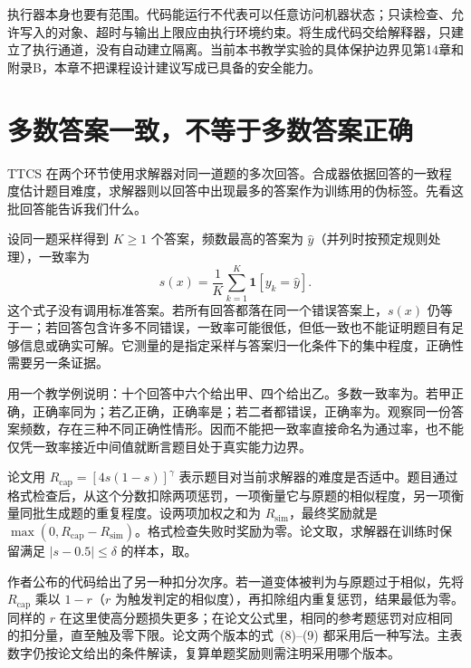 执行器本身也要有范围。代码能运行不代表可以任意访问机器状态；只读检查、允许写入的对象、超时与输出上限应由执行环境约束。将生成代码交给解释器，只建立了执行通道，没有自动建立隔离。当前本书教学实验的具体保护边界见第14章和附录B，本章不把课程设计建议写成已具备的安全能力。

\section{多数答案一致，不等于多数答案正确}
\label{sec:ch11-consensus}

TTCS 在两个环节使用求解器对同一道题的多次回答。合成器依据回答的一致程度估计题目难度，求解器则以回答中出现最多的答案作为训练用的伪标签\cite{ttcs-2601}。先看这批回答能告诉我们什么。

设同一题采样得到 $K\geq1$ 个答案，频数最高的答案为 $\hat y$（并列时按预定规则处理），一致率为
\begin{equation}
 s(x)=\frac{1}{K}\sum_{k=1}^{K}\mathbf1[y_k=\hat y].
 \label{eq:ch11-consistency}
\end{equation}
这个式子没有调用标准答案。若所有回答都落在同一个错误答案上，$s(x)$ 仍等于一；若回答包含许多不同错误，一致率可能很低，但低一致也不能证明题目有足够信息或确实可解。它测量的是指定采样与答案归一化条件下的集中程度，正确性需要另一条证据。

用一个教学例说明：十个回答中六个给出甲、四个给出乙。多数一致率为。若甲正确，正确率同为；若乙正确，正确率是；若二者都错误，正确率为。观察同一份答案频数，存在三种不同正确性情形。因而不能把一致率直接命名为通过率，也不能仅凭一致率接近中间值就断言题目处于真实能力边界。

论文用 $R_{\mathrm{cap}}=[4s(1-s)]^\gamma$ 表示题目对当前求解器的难度是否适中。题目通过格式检查后，从这个分数扣除两项惩罚，一项衡量它与原题的相似程度，另一项衡量同批生成题的重复程度。设两项加权之和为 $R_{\mathrm{sim}}$，最终奖励就是 $\max(0,R_{\mathrm{cap}}-R_{\mathrm{sim}})$。格式检查失败时奖励为零。论文取，求解器在训练时保留满足 $|s-0.5|\leq\delta$ 的样本，取\cite{ttcs-2601}。

作者公布的代码给出了另一种扣分次序。若一道变体被判为与原题过于相似，先将 $R_{\mathrm{cap}}$ 乘以 $1-r$（$r$ 为触发判定的相似度），再扣除组内重复惩罚，结果最低为零\cite{ttcs-code-e29e95c}。同样的 $r$ 在这里使高分题损失更多；在论文公式里，相同的参考题惩罚对应相同的扣分量，直至触及零下限。论文两个版本的式~(8)--(9) 都采用后一种写法。主表数字仍按论文给出的条件解读，复算单题奖励则需注明采用哪个版本。


